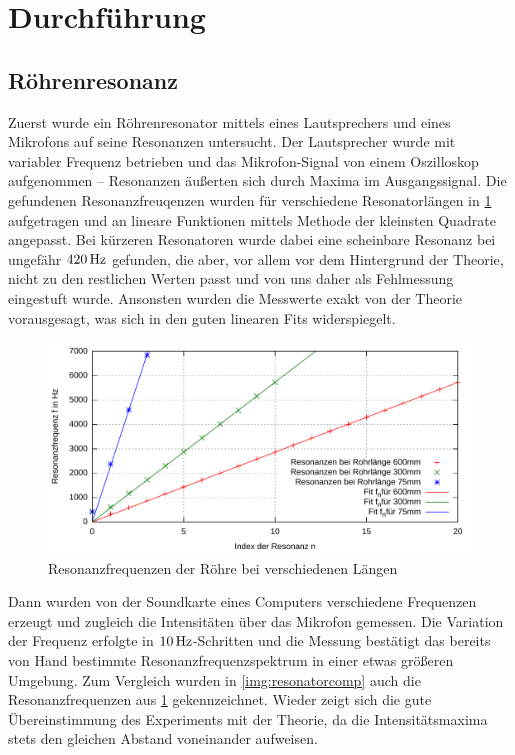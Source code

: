 \documentclass[numbers=noenddot,12pt,a4paper]{scrartcl}
\begin{document}
\section{Durchführung}
\subsection{Röhrenresonanz}
Zuerst wurde ein Röhrenresonator mittels eines Lautsprechers und eines Mikrofons auf seine Resonanzen untersucht. Der Lautsprecher wurde mit variabler Frequenz betrieben und das Mikrofon-Signal von einem Oszilloskop aufgenommen -- Resonanzen äußerten sich durch Maxima im Ausgangssignal. Die gefundenen Resonanzfreuqenzen wurden für verschiedene Resonatorlängen in \ref{img:resonatorhand} aufgetragen und an lineare Funktionen mittels Methode der kleinsten Quadrate angepasst. Bei kürzeren Resonatoren wurde dabei eine scheinbare Resonanz bei ungefähr $\unit[420]{Hz}$ gefunden, die aber, vor allem vor dem Hintergrund der Theorie, nicht zu den restlichen Werten passt und von uns daher als Fehlmessung eingestuft wurde. Ansonsten wurden die Messwerte exakt von der Theorie vorausgesagt, was sich in den guten linearen Fits widerspiegelt.
\begin{figure}[H]
	\includegraphics[width=\textwidth]{messwerte/resonanzfrequenzen.pdf}
	\caption{Resonanzfrequenzen der Röhre bei verschiedenen Längen}\label{img:resonatorhand}
\end{figure}
Dann wurden von der Soundkarte eines Computers verschiedene Frequenzen erzeugt und zugleich die Intensitäten über das Mikrofon gemessen. Die Variation der Frequenz erfolgte in $\unit[10]{Hz}$-Schritten und die Messung bestätigt das bereits von Hand bestimmte Resonanzfrequenzspektrum in einer etwas größeren Umgebung. Zum Vergleich wurden in \ref{img:resonatorcomp} auch die Resonanzfrequenzen aus \ref{img:resonatorhand} gekennzeichnet. Wieder zeigt sich die gute Übereinstimmung des Experiments mit der Theorie, da die Intensitätsmaxima stets den gleichen Abstand voneinander aufweisen.
\end{document}
